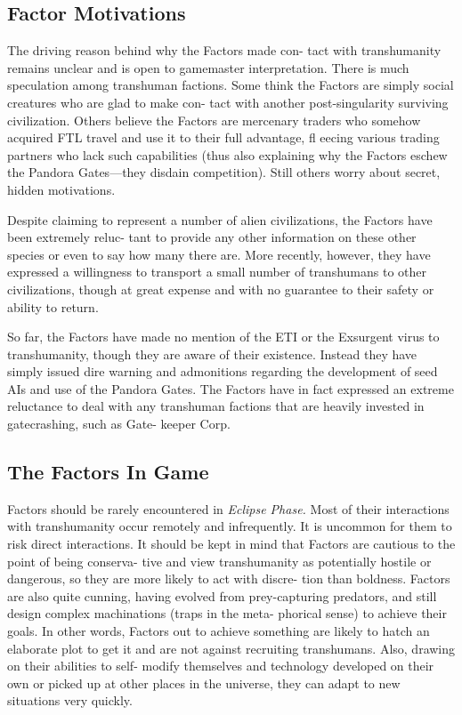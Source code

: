 \subsection{Factor Motivations}

The driving reason behind why the Factors made con-
tact with transhumanity remains unclear and is open to 
gamemaster interpretation. There is much speculation 
among transhuman factions. Some think the Factors 
are simply social creatures who are glad to make con-
tact with another post-singularity surviving civilization. 
Others believe the Factors are mercenary traders who 
somehow acquired FTL travel and use it to their full 
advantage, fl eecing various trading partners who lack 
such capabilities (thus also explaining why the Factors 
eschew the Pandora Gates—they disdain competition). 
Still others worry about secret, hidden motivations.

Despite claiming to represent a number of alien 
civilizations, the Factors have been extremely reluc-
tant to provide any other information on these other 
species or even to say how many there are. More 
recently, however, they have expressed a willingness 
to transport a small number of transhumans to other 
civilizations, though at great expense and with no 
guarantee to their safety or ability to return.

So far, the Factors have made no mention of the 
ETI or the Exsurgent virus to transhumanity, though 
they are aware of their existence. Instead they have 
simply issued dire warning and admonitions regarding 
the development of seed AIs and use of the Pandora 
Gates. The Factors have in fact expressed an extreme 
reluctance to deal with any transhuman factions that 
are heavily invested in gatecrashing, such as Gate-
keeper Corp.

\subsection{The Factors In Game }

Factors should be rarely encountered in \textit{Eclipse Phase.}
Most of their interactions with transhumanity occur 
remotely and infrequently. It is uncommon for them to 
risk direct interactions. It should be kept in mind that 
Factors are cautious to the point of being conserva-
tive and view transhumanity as potentially hostile or 
dangerous, so they are more likely to act with discre-
tion than boldness. Factors are also quite cunning, 
having evolved from prey-capturing predators, and 
still design complex machinations (traps in the meta-
phorical sense) to achieve their goals. In other words, 
Factors out to achieve something are likely to hatch an 
elaborate plot to get it and are not against recruiting 
transhumans. Also, drawing on their abilities to self-
modify themselves and technology developed on their 
own or picked up at other places in the universe, they 
can adapt to new situations very quickly. 

